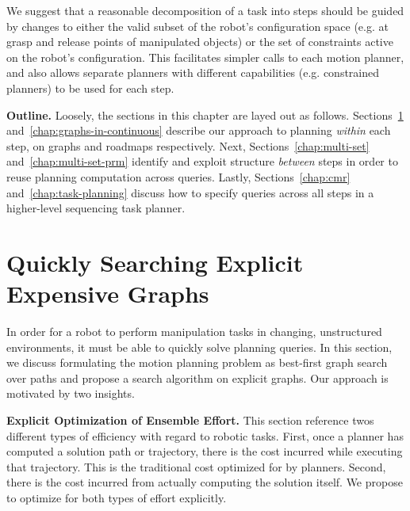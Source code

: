 
We suggest that a reasonable decomposition of a task into steps
should be guided by changes to either
the valid subset of the robot's configuration space
(e.g. at grasp and release points of manipulated objects)
or the set of constraints active on the robot's configuration.
This facilitates simpler calls to each motion planner,
and also allows separate planners with different capabilities
(e.g. constrained planners)
to be used for each step.

\textbf{Outline.}
Loosely, the sections in this chapter are layed out as follows.
Sections~\ref{chap:e8} and~\ref{chap:graphs-in-continuous}
describe our approach to planning \emph{within} each step,
on graphs and roadmaps respectively.
Next,
Sections~\ref{chap:multi-set} and~\ref{chap:multi-set-prm}
identify and exploit structure \emph{between} steps
in order to reuse planning computation across queries.
Lastly,
Sections~\ref{chap:cmr} and~\ref{chap:task-planning}
discuss how to specify queries across all steps
in a higher-level sequencing task planner.


\section{Quickly Searching Explicit Expensive Graphs}
\label{chap:e8}

In order for a robot to perform manipulation tasks
in changing, unstructured environments,
it must be able to quickly solve planning queries.
In this section,
we discuss formulating
the motion planning problem as best-first graph search over paths
and propose a search algorithm on explicit graphs.
Our approach is motivated by two insights.

\textbf{Explicit Optimization of Ensemble Effort.}
This section reference twos different types of efficiency
with regard to robotic tasks.
First, once a planner has computed a solution path or trajectory,
there is the cost incurred while executing that trajectory.
This is the traditional cost optimized for by planners.
Second, there is the cost incurred from actually computing the solution
itself.
We propose to optimize for both types of effort explicitly.

